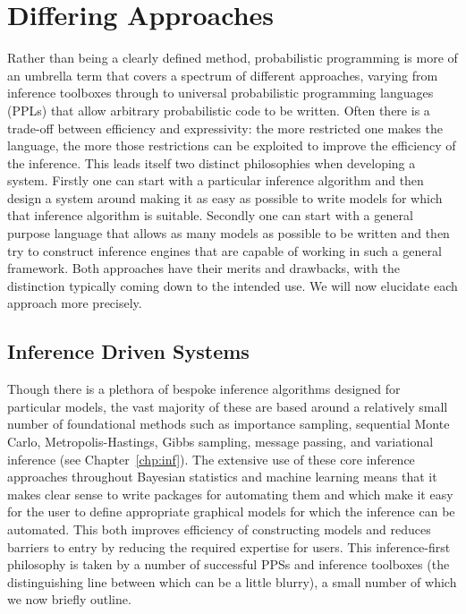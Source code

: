 
\section{Differing Approaches}
\label{sec:probprog:two}

Rather than being a clearly defined method,
probabilistic programming is more of an umbrella term that covers a spectrum of 
different approaches, varying from inference toolboxes through to universal probabilistic programming
languages (PPLs) that allow
arbitrary probabilistic code to be written.
Often there is a trade-off between efficiency and expressivity: the more restricted
one makes the language, the more those restrictions can be exploited to improve the efficiency
of the inference.  This leads itself two distinct philosophies when developing a system. 
Firstly one can start with a particular inference algorithm and then design a system around making it as
easy as possible to write models for which that inference algorithm is suitable.  Secondly one can start
with  a general purpose language that allows as many models as possible to be written and then try to construct
inference engines that are capable of working in such a general framework.  Both approaches 
have their merits and drawbacks, with the distinction typically coming down to the intended use.
We will now elucidate each approach more precisely.  

\subsection{Inference Driven Systems}
\label{sec:probprog:two:inf}

Though there is a plethora of bespoke inference algorithms designed for particular models, the vast majority of these are based around
a relatively small number of foundational methods such as importance sampling, sequential Monte Carlo,
Metropolis-Hastings, Gibbs sampling, message passing, and variational inference (see Chapter~\ref{chp:inf}).
The extensive use of these core inference approaches throughout Bayesian statistics and machine
learning means that it makes clear sense to write packages for automating them and which
make it easy for the user to define appropriate graphical models for which the inference can be automated.
This both improves efficiency of constructing models and reduces barriers to entry by reducing the
required expertise for users.  This inference-first philosophy is taken by a number of successful PPSs
and inference toolboxes (the distinguishing line between which can be a little blurry), a small number of which we now 
briefly outline.

